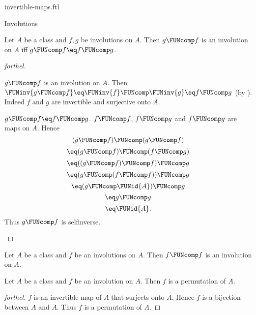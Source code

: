 \documentclass{stex}
\begin{document}
\begin{smodule}{invertible-maps.ftl}
\begin{sfragment}{Involutions}
  \begin{proposition}[forthel,id=FOUNDATIONS_09_6897019612299264]
    Let $A$ be a class and $f, g$ be involutions on $A$.
    Then $g \FUNcomp f$ is an involution on $A$ iff $g \FUNcomp f \eq f \FUNcomp g$.
  \end{proposition}
  \begin{proof}[forthel]
    \begin{case}{$g \FUNcomp f$ is an involution on $A$.}
      Then $\FUNinv{g \FUNcomp f}
        \eq \FUNinv{f} \FUNcomp \FUNinv{g}
        \eq f \FUNcomp g$
      (by ).
      Indeed $f$ and $g$ are invertible and surjective onto $A$.
    \end{case}

    \begin{case}{$g \FUNcomp f \eq f \FUNcomp g$.}
      $f \FUNcomp f$, $f \FUNcomp g$ and $f \FUNcomp g$ are maps on $A$.
      Hence
      \[  (g \FUNcomp f) \FUNcomp (g \FUNcomp f)       \]
      \[    \eq (g \FUNcomp f) \FUNcomp (f \FUNcomp g)   \]
      \[    \eq ((g \FUNcomp f) \FUNcomp f) \FUNcomp g   \]
      \[    \eq (g \FUNcomp (f \FUNcomp f)) \FUNcomp g   \]
      \[    \eq (g \FUNcomp \FUNid{A}) \FUNcomp g       \]
      \[    \eq g \FUNcomp g                       \]
      \[    \eq \FUNid{A}.                        \]
      Thus $g \FUNcomp f$ is selfinverse.
    \end{case}
  \end{proof}

  \begin{corollary}[forthel,id=FOUNDATIONS_09_5958206868160512]
    Let $A$ be a class and $f$ be an involutions on $A$.
    Then $f \FUNcomp f$ is an involution on $A$.
  \end{corollary}

  \begin{proposition}[forthel,id=FOUNDATIONS_09_2314262743613440]
    Let $A$ be a class and $f$ be an involution on $A$.
    Then $f$ is a permutation of $A$.
  \end{proposition}
  \begin{proof}[forthel]
    $f$ is an invertible map of $A$ that surjects onto $A$.
    Hence $f$ is a bijection between $A$ and $A$.
    Thus $f$ is a permutation of $A$.
  \end{proof}
\end{sfragment}
\end{smodule}
\end{document}
